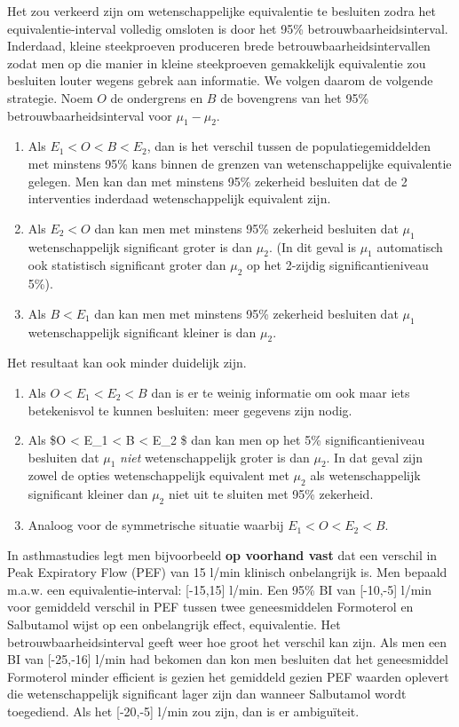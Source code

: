 \documentclass[
  12pt,dutch,coursenotes]{book}
\providecommand{\tightlist}{%
  \setlength{\itemsep}{0pt}\setlength{\parskip}{0pt}}
\theoremstyle{definition}
\theoremstyle{definition}
\theoremstyle{definition}
\theoremstyle{remark}
\begin{document}
Het zou verkeerd zijn om wetenschappelijke equivalentie te besluiten zodra het
equivalentie-interval volledig omsloten is door het 95\%
betrouwbaarheidsinterval. Inderdaad, kleine steekproeven produceren brede
betrouwbaarheidsintervallen zodat men op die manier in kleine steekproeven
gemakkelijk equivalentie zou besluiten louter wegens gebrek aan
informatie. We volgen daarom de volgende strategie. Noem \(O\) de ondergrens
en \(B\) de bovengrens van het 95\% betrouwbaarheidsinterval voor \(\mu_1-\mu_2\).

\begin{enumerate}
\def\labelenumi{\arabic{enumi}.}
\item
  Als \(E_1 < O < B < E_2\), dan is het verschil tussen de populatiegemiddelden met minstens 95\% kans binnen de grenzen van wetenschappelijke equivalentie gelegen. Men kan dan met minstens 95\% zekerheid besluiten dat de 2 interventies inderdaad wetenschappelijk equivalent zijn.
\item
  Als \(E_2 < O\) dan kan men met minstens 95\% zekerheid besluiten dat \(\mu_1\) wetenschappelijk significant groter is dan \(\mu_2\). (In dit geval is \(\mu_1\) automatisch ook statistisch significant groter dan \(\mu_2\) op het 2-zijdig significantieniveau 5\%).
\item
  Als \(B < E_1\) dan kan men met minstens 95\% zekerheid besluiten dat \(\mu_1\) wetenschappelijk significant kleiner is dan \(\mu_2.\)
\end{enumerate}

Het resultaat kan ook minder duidelijk zijn.

\begin{enumerate}
\def\labelenumi{\arabic{enumi}.}
\tightlist
\item
  Als \(O < E_1 < E_2 < B\) dan is er te weinig informatie om ook maar iets betekenisvol te kunnen besluiten: meer gegevens zijn nodig.
\item
  Als \$O \textless{} E\_1 \textless{} B \textless{} E\_2 \$ dan kan men op het 5\% significantieniveau besluiten dat \(\mu_1\) \emph{niet} wetenschappelijk groter is dan \(\mu_2\). In dat geval zijn zowel de opties wetenschappelijk equivalent met \(\mu_2\) als wetenschappelijk significant kleiner dan \(\mu_2\) niet uit te sluiten met 95\% zekerheid.
\item
  Analoog voor de symmetrische situatie waarbij \(E_1 < O < E_2 < B.\)
\end{enumerate}

In asthmastudies legt men bijvoorbeeld \textbf{op voorhand vast} dat een verschil in Peak Expiratory Flow (PEF) van 15 l/min klinisch onbelangrijk is. Men bepaald m.a.w. een equivalentie-interval: {[}-15,15{]} l/min. Een 95\% BI van {[}-10,-5{]} l/min voor gemiddeld verschil in PEF tussen twee geneesmiddelen Formoterol en Salbutamol wijst op een onbelangrijk effect, equivalentie. Het betrouwbaarheidsinterval geeft weer hoe groot het verschil kan zijn.
Als men een BI van {[}-25,-16{]} l/min had bekomen dan kon men besluiten dat het geneesmiddel Formoterol minder efficient is gezien het gemiddeld gezien PEF waarden oplevert die wetenschappelijk significant lager zijn dan wanneer Salbutamol wordt toegediend. Als het {[}-20,-5{]} l/min zou zijn, dan is er ambiguïteit.

  
\end{document}
